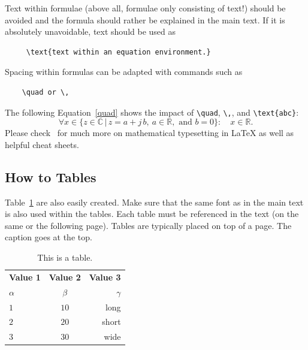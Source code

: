 Text within formulae (above all, formulae only consisting of text!) should be avoided and the
formula should rather be explained in the main text. If it is absolutely unavoidable, text should be
used as
\begin{verbatim}
     \text{text within an equation environment.}
\end{verbatim}
Spacing within formulas can be adapted with commands such as
\begin{verbatim}
    \quad or \,
\end{verbatim}
The following Equation~\eqref{quad} shows the impact of \verb|\quad|, \verb|\,|, and \verb|\text{abc}|:
\begin{equation}
    \label{quad} \forall x \in \{ z\in\mathbb{C} \,|\, z = a + j\,b, \ a \in \mathbb{R}, \text{ and }
    b = 0 \}: \quad x \in \mathbb{R}.
\end{equation}
Please check~\cite{TUG, Oet23} for much more on mathematical typesetting in \LaTeX{} as well as
helpful cheat sheets.

\subsection{How to Tables}
Table~\ref{tab:mytable} are also easily created. Make sure that the same font as in the main text is
also used within the tables. Each table must be referenced in the text (on the same or the following
page). Tables are typically placed on top of a page. The caption goes at the top.
\begin{table}[t]
    \caption{This is a table.}      %
    \label{tab:mytable}  
    \centering 
    \setlength{\tabcolsep}{4.5pt}
    \begin{tabular}{|l|c|r|}        %
        \hline
        \textbf{Value 1} & \textbf{Value 2} & \textbf{Value 3}\\
        $\alpha$ & $\beta$ & $\gamma$ \\
        \hline               
        $1$ & $10$ & long \\
        $2$ & $20$ & short \\
        $3$ & $30$ & wide \\
        \hline 
    \end{tabular}
\end{table}

